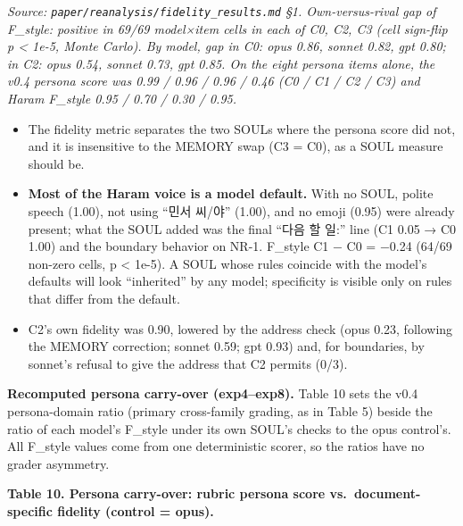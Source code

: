 \documentclass[10pt]{article}
\providecommand{\tightlist}{\setlength{\itemsep}{0pt}\setlength{\parskip}{0pt}}
\begin{document}
\emph{Source: \texttt{paper/\allowbreak{}reanalysis/\allowbreak{}fidelity\_\allowbreak{}results.\allowbreak{}md} §1. Own-versus-rival gap of F\_style: positive in 69/69 model×item cells in each of C0, C2, C3 (cell sign-flip p \textless{} 1e-5, Monte Carlo). By model, gap in C0: opus 0.86, sonnet 0.82, gpt 0.80; in C2: opus 0.54, sonnet 0.73, gpt 0.85. On the eight persona items alone, the v0.4 persona score was 0.99 / 0.96 / 0.96 / 0.46 (C0 / C1 / C2 / C3) and Haram F\_style 0.95 / 0.70 / 0.30 / 0.95.}

\begin{itemize}
\tightlist
\item
  The fidelity metric separates the two SOULs where the persona score did not, and it is insensitive to the MEMORY swap (C3 = C0), as a SOUL measure should be.
\item
  \textbf{Most of the Haram voice is a model default.} With no SOUL, polite speech (1.00), not using ``민서 씨/야'' (1.00), and no emoji (0.95) were already present; what the SOUL added was the final ``다음 할 일:'' line (C1 0.05 → C0 1.00) and the boundary behavior on NR-1. F\_style C1 − C0 = −0.24 (64/69 non-zero cells, p \textless{} 1e-5). A SOUL whose rules coincide with the model's defaults will look ``inherited'' by any model; specificity is visible only on rules that differ from the default.
\item
  C2's own fidelity was 0.90, lowered by the address check (opus 0.23, following the MEMORY correction; sonnet 0.59; gpt 0.93) and, for boundaries, by sonnet's refusal to give the address that C2 permits (0/3).
\end{itemize}

\textbf{Recomputed persona carry-over (exp4--exp8).} Table 10 sets the v0.4 persona-domain ratio (primary cross-family grading, as in Table 5) beside the ratio of each model's F\_style under its own SOUL's checks to the opus control's. All F\_style values come from one deterministic scorer, so the ratios have no grader asymmetry.

\textbf{Table 10. Persona carry-over: rubric persona score vs.~document-specific fidelity (control = opus).}
\end{document}
